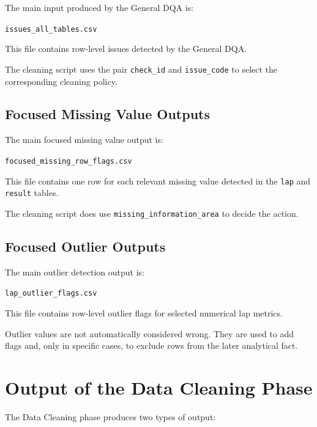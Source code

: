 \documentclass[a4paper,11pt]{article}
\begin{document}
	The main input produced by the General DQA is:
	
	\begin{center}
		\texttt{issues\_all\_tables.csv}
	\end{center}
	
	This file contains row-level issues detected by the General DQA.
	
	
	The cleaning script uses the pair \texttt{check\_id} and \texttt{issue\_code} to select the corresponding cleaning policy.
	
	\subsection{Focused Missing Value Outputs}
	
	The main focused missing value output is:
	
	\begin{center}
		\texttt{focused\_missing\_row\_flags.csv}
	\end{center}
	
	This file contains one row for each relevant missing value detected in the \texttt{lap} and \texttt{result} tables.
	

	The cleaning script does use \texttt{missing\_information\_area}  to decide the action.
	
	\subsection{Focused Outlier Outputs}
	
	The main outlier detection output is:
	
	\begin{center}
		\texttt{lap\_outlier\_flags.csv}
	\end{center}
	
	This file contains row-level outlier flags for selected numerical lap metrics.

	
	Outlier values are not automatically considered wrong.
	They are used to add flags and, only in specific cases, to exclude rows from the later analytical fact.
	
	\section{Output of the Data Cleaning Phase}
	
	The Data Cleaning phase produces two types of output:
	
\end{document}
